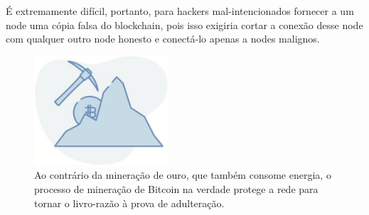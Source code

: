 
É extremamente difícil, portanto, para hackers mal-intencionados fornecer a um node uma cópia falsa do blockchain, pois isso exigiria cortar a conexão desse node com qualquer outro node honesto e conectá-lo apenas a nodes malignos.








\begin{figure}
  \centering
  \includegraphics[width=5cm]{imagens/capitulo-06-mineracao.jpg}
  \caption{Ao contrário da mineração de ouro, que também consome energia, o processo de mineração de Bitcoin na verdade protege a rede para tornar o livro-razão à prova de adulteração.}
\end{figure}




